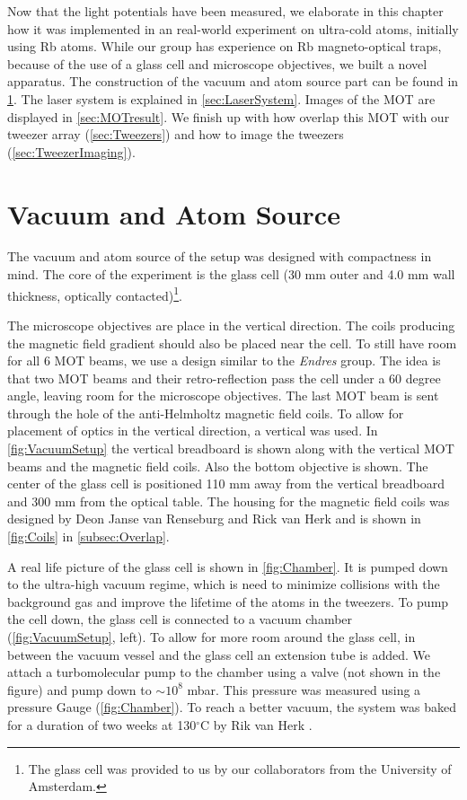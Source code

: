 Now that the light potentials have been measured, we elaborate in this chapter how it was implemented in an real-world experiment on ultra-cold atoms, initially using Rb atoms.
While our group has experience on Rb magneto-optical traps, because of the use of a glass cell and microscope objectives, we built a novel apparatus. 
The construction of the vacuum and atom source part can be found in \cref{sec:VacuumAtom}.
The laser system is explained in \cref{sec:LaserSystem}.
Images of the MOT are displayed in \cref{sec:MOTresult}.
We finish up with how overlap this MOT with our tweezer array (\cref{sec:Tweezers}) and how to image the tweezers (\cref{sec:TweezerImaging}).

\section{Vacuum and Atom Source}\label{sec:VacuumAtom}

The vacuum and atom source of the setup was designed with compactness in mind. 
The core of the experiment is the glass cell (30 mm outer and 4.0 mm wall thickness, optically contacted)\footnote{The glass cell was provided to us by our collaborators from the University of Amsterdam.}.

The microscope objectives are place in the vertical direction.
The coils producing the magnetic field gradient should also be placed near the cell. 
To still have room for all 6 MOT beams, we use a design similar to the \textit{Endres} group.
The idea is that two MOT beams and their retro-reflection pass the cell under a 60 degree angle, leaving room for the microscope objectives. 
The last MOT beam is sent through the hole of the anti-Helmholtz magnetic field coils.
To allow for placement of optics in the vertical direction, a vertical was used. 
In \cref{fig:VacuumSetup} the vertical breadboard is shown along with the vertical MOT beams and the magnetic field coils. 
Also the bottom objective is shown. 
The center of the glass cell is positioned 110 mm away from the vertical breadboard and 300 mm from the optical table. 
The housing for the magnetic field coils was designed by Deon Janse van Renseburg and Rick van Herk and is shown in \cref{fig:Coils} in \cref{subsec:Overlap}.

A real life picture of the glass cell is shown in \cref{fig:Chamber}.
It is pumped down to the ultra-high vacuum regime, which is need to minimize collisions with the background gas and improve the lifetime of the atoms in the tweezers.
To pump the cell down, the glass cell is connected to a vacuum chamber (\cref{fig:VacuumSetup}, left).
To allow for more room around the glass cell, in between the vacuum vessel and the glass cell an extension tube is added.
We attach a turbomolecular pump to the chamber using a valve (not shown in the figure) and pump down to $\sim 10^{8}$ mbar.
This pressure was measured using a pressure Gauge (\cref{fig:Chamber}).
To reach a better vacuum, the system was baked for a duration of two weeks at 130${}^{\circ}$C by Rik van Herk \cite{Herk2022}.

